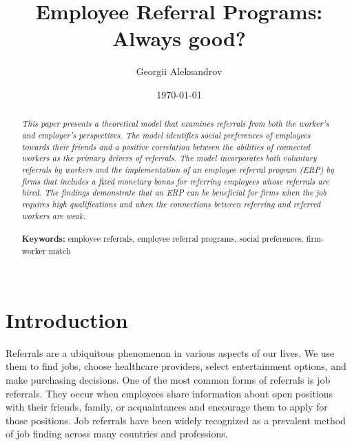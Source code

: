 \documentclass[12pt]{article}
\begin{document}
\begin{titlepage}
\title{Employee Referral Programs: Always good?}%
\author{Georgii Aleksandrov}%
\date{\today}
\maketitle
\begin{abstract}
\noindent \textit{This paper presents a theoretical model that examines referrals from both the worker's and employer's perspectives. The model identifies social preferences of employees towards their friends and a positive correlation between the abilities of connected workers as the primary drivers of referrals. The model incorporates both voluntary referrals by workers and the implementation of an employee referral program (ERP) by firms that includes a fixed monetary bonus for referring employees whose referrals are hired. The findings demonstrate that an ERP can be beneficial for firms when the job requires high qualifications and when the connections between referring and referred workers are weak.}\\
\vspace{0in}\\
\noindent\textbf{Keywords:} employee referrals, employee referral programs, social preferences, firm-worker match\\
\vspace{0in}\\

\bigskip
\end{abstract}
\setcounter{page}{0}
\thispagestyle{empty}
\end{titlepage}
\pagebreak \newpage




\doublespacing


\section{Introduction} \label{sec:introduction}

Referrals are a ubiquitous phenomenon in various aspects of our lives. We use them to find jobs, choose healthcare providers, select entertainment options, and make purchasing decisions. One of the most common forms of referrals is job referrals. They occur when employees share information about open positions with their friends, family, or acquaintances and encourage them to apply for those positions. Job referrals have been widely recognized as a prevalent method of job finding across many countries and professions. 
\end{document}
